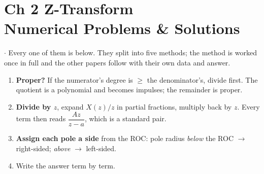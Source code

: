 \section*{\color{acc}Ch 2 \textperiodcentered{} Z-Transform\\[2pt]
{\large\textcolor{sub}{Numerical Problems \& Solutions}}}
\vspace{-4pt}{\color{acc}\rule{\textwidth}{1.1pt}}\vspace{4pt}

{\color{sub}\footnotesize {} \gap$\cdot$\gap {} Every one
of them is below. They split into five methods; the method is worked once in full and the
other papers follow with their own data and answer.}

\begin{enumerate}
  \item \textbf{Proper?} If the numerator's degree is $\ge$ the denominator's, divide first.
        The quotient is a polynomial and becomes impulses; the remainder is proper.
  \item \textbf{Divide by $z$}, expand $X(z)/z$ in partial fractions, multiply back by $z$.
        Every term then reads $\dfrac{Az}{z-a}$, which is a standard pair.
  \item \textbf{Assign each pole a side} from the ROC: pole radius \emph{below} the ROC
        $\rightarrow$ right-sided; \emph{above} $\rightarrow$ left-sided.
  \item Write the answer term by term.
\end{enumerate}

